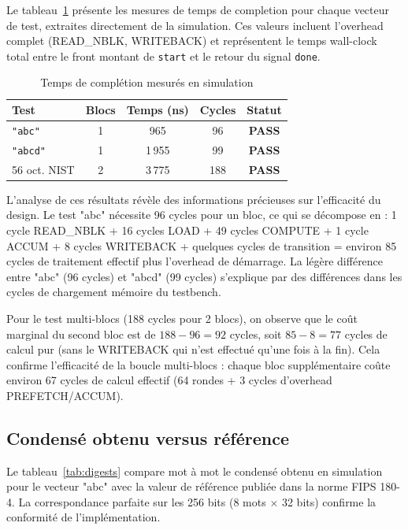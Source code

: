 Le tableau~\ref{tab:results} présente les mesures de temps de completion pour chaque vecteur de test, extraites directement de la simulation. Ces valeurs incluent l'overhead complet (READ\_NBLK, WRITEBACK) et représentent le temps wall-clock total entre le front montant de \texttt{start} et le retour du signal \texttt{done}.

\begin{table}[H]
\centering
\caption{Temps de complétion mesurés en simulation}
\label{tab:results}
\begin{tabular}{lcccc}
\toprule
\textbf{Test} & \textbf{Blocs} & \textbf{Temps (ns)} & \textbf{Cycles} & \textbf{Statut} \\
\midrule
\texttt{"abc"} & 1 & 965 & 96 & \textbf{PASS} \\
\texttt{"abcd"} & 1 & 1\,955 & 99 & \textbf{PASS} \\
56 oct. NIST & 2 & 3\,775 & 188 & \textbf{PASS} \\
\bottomrule
\end{tabular}
\end{table}

L'analyse de ces résultats révèle des informations précieuses sur l'efficacité du design. Le test "abc" nécessite 96 cycles pour un bloc, ce qui se décompose en : 1 cycle READ\_NBLK + 16 cycles LOAD + 49 cycles COMPUTE + 1 cycle ACCUM + 8 cycles WRITEBACK + quelques cycles de transition = environ 85 cycles de traitement effectif plus l'overhead de démarrage. La légère différence entre "abc" (96 cycles) et "abcd" (99 cycles) s'explique par des différences dans les cycles de chargement mémoire du testbench.

Pour le test multi-blocs (188 cycles pour 2 blocs), on observe que le coût marginal du second bloc est de $188 - 96 = 92$ cycles, soit $85 - 8 = 77$ cycles de calcul pur (sans le WRITEBACK qui n'est effectué qu'une fois à la fin). Cela confirme l'efficacité de la boucle multi-blocs : chaque bloc supplémentaire coûte environ 67 cycles de calcul effectif (64 rondes + 3 cycles d'overhead PREFETCH/ACCUM).

\subsection{Condensé obtenu versus référence}

Le tableau~\ref{tab:digests} compare mot à mot le condensé obtenu en simulation pour le vecteur "abc" avec la valeur de référence publiée dans la norme FIPS 180-4. La correspondance parfaite sur les 256 bits (8 mots $\times$ 32 bits) confirme la conformité de l'implémentation.

